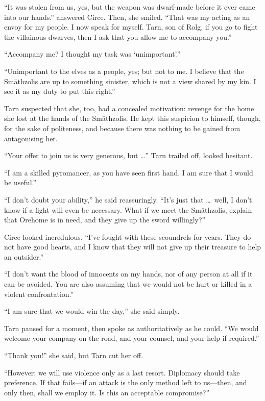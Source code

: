 ``It was stolen from us, yes, but the weapon was dwarf-made before it ever came into our hands.'' answered Circe.  Then, she smiled.  ``That was my acting as an envoy for my people.  I now speak for myself.  Tarn, son of Rolg, if you go to fight the villainous dwarves, then I ask that you allow me to accompany you.''

``Accompany me?  I thought my task was `unimportant'.''

``Unimportant to the elves as a people, yes; but not to me.  I believe that the Sm\=athzolis are up to something sinister, which is not a view shared by my kin.  I see it as my duty to put this right.''

Tarn suspected that she, too, had a concealed motivation: revenge for the home she lost at the hands of the Sm\=athzolis.  He kept this suspicion to himself, though, for the sake of politeness, and because there was nothing to be gained from antagonising her.

``Your offer to join us is very generous, but \ldots'' Tarn trailed off, looked hesitant.

``I am a skilled pyromancer, as you have seen first hand.  I am sure that I would be useful.''

``I don't doubt your ability,'' he said reassuringly.  ``It's just that \ldots\ well, I don't know if a fight will even be necessary.  What if we meet the Sm\=athzolis, explain that Orehome is in need, and they give up the sword willingly?''

Circe looked incredulous.  ``I've fought with these scoundrels for years.  They do not have good hearts, and I know that they will not give up their treasure to help an outsider.''

``I don't want the blood of innocents on my hands, nor of any person at all if it can be avoided.  You are also assuming that we would not be hurt or killed in a violent confrontation.''

``I am sure that we would win the day,'' she said simply.

Tarn paused for a moment, then spoke as authoritatively as he could.  ``We would welcome your company on the road, and your counsel, and your help if required.''

``Thank you!'' she said, but Tarn cut her off.

``However: we will use violence only as a last resort.  Diplomacy should take preference.  If that fails---if an attack is the only method left to us---then, and only then, shall we employ it.  Is this an acceptable compromise?''

